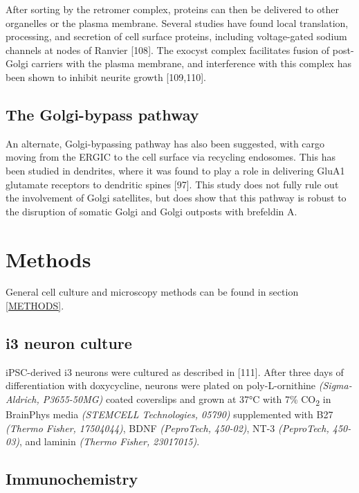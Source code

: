 \documentclass[
  12pt,
  a4paper,
]{book}
\begin{document}
After sorting by the retromer complex, proteins can then be delivered to other organelles or the plasma membrane. Several studies have found local translation, processing, and secretion of cell surface proteins, including voltage-gated sodium channels at nodes of Ranvier {[}108{]}. The exocyst complex facilitates fusion of post-Golgi carriers with the plasma membrane, and interference with this complex has been shown to inhibit neurite growth {[}109,110{]}.

\hypertarget{the-golgi-bypass-pathway}{%
\subsection{The Golgi-bypass pathway}\label{the-golgi-bypass-pathway}}

An alternate, Golgi-bypassing pathway has also been suggested, with cargo moving from the ERGIC to the cell surface via recycling endosomes. This has been studied in dendrites, where it was found to play a role in delivering GluA1 glutamate receptors to dendritic spines {[}97{]}. This study does not fully rule out the involvement of Golgi satellites, but does show that this pathway is robust to the disruption of somatic Golgi and Golgi outposts with brefeldin A.

\hypertarget{methods-2}{%
\section{Methods}\label{methods-2}}

General cell culture and microscopy methods can be found in section \ref{METHODS}.

\hypertarget{i3-neuron-culture}{%
\subsection{i3 neuron culture}\label{i3-neuron-culture}}

iPSC-derived i3 neurons were cultured as described in {[}111{]}. After three days of differentiation with doxycycline, neurons were plated on poly-L-ornithine \emph{(Sigma-Aldrich, P3655-50MG)} coated coverslips and grown at 37°C with 7\% CO\textsubscript{2} in BrainPhys media \emph{(STEMCELL Technologies, 05790)} supplemented with B27 \emph{(Thermo Fisher, 17504044)}, BDNF \emph{(PeproTech, 450-02)}, NT-3 \emph{(PeproTech, 450-03)}, and laminin \emph{(Thermo Fisher, 23017015)}.

\hypertarget{immunochemistry}{%
\subsection{Immunochemistry}\label{immunochemistry}}
\end{document}
